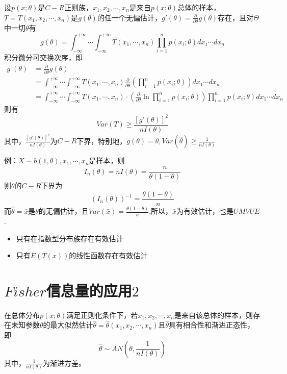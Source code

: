 \begin{theorem}[$C-R$不等式]
设$p(x;\theta)$是$C-R$正则族，$x_{1},x_{2},\cdots,x_{n}$是来自$p(x;\theta)$总体的样本，$T=T(x_{1},x_{2},\cdots,x_{n})$是$g(\theta)$的任一个无偏估计，$g'(\theta )=\frac{\partial }{\partial \theta } g(\theta )$存在，且对$\Theta$中一切$\theta$有
$$g(\theta )=\int_{-\infty }^{+\infty } \cdots \int_{-\infty }^{+\infty }T(x_{1},\cdots ,x_{n})\prod_{i=1}^{n}p(x_{i};\theta )dx_{1}\cdots dx_{n} $$
积分微分可交换次序，即
$$\begin{aligned}
g^{\prime}(\theta) &=\frac{\partial}{\partial \theta} g(\theta)\\
&=\int_{-\infty}^{+\infty} \cdots \int_{-\infty}^{+\infty} T\left(x_{1}, \cdots, x_{n}\right) \frac{\partial}{\partial \theta}\left(\prod_{i=1}^{n} p\left(x_{i} ; \theta\right)\right) d x_{1}\cdots d x_{n} \\
&=\int_{-\infty}^{+\infty} \cdots \int_{-\infty}^{+\infty} T\left(x_{1}, \cdots, x_{n}\right) \cdot\left(\frac{\partial}{\partial \theta} \ln \prod_{i=1}^{n} p\left(x_{i} ; \theta\right)\right) \prod_{i=1}^{n} p\left(x_{i}; \theta\right) d x_{1} \cdots d x_{n}
\end{aligned}$$
则有$$Var(T)\ge \frac{\left  [ g'(\theta ) \right ] ^{2}}{nI(\theta )} $$
其中，$\frac{\left  [ g'(\theta ) \right ] ^{2}}{nI(\theta )}$为$C-R$下界，特别地，$g(\theta)=\theta,Var(\hat{\theta})\ge \frac{1}{nI(\theta)}$
\end{theorem}
例：$X\sim b(1,\theta),x_{1}, \cdots, x_{n}$是样本，则$$I_{n}(\theta)=nI(\theta)=\frac{n}{\theta(1-\theta)}$$
则$\theta$的$C-R$下界为$$(I_{n}(\theta))^{-1}=\frac{\theta(1-\theta)}{n}$$
而$\hat{\theta}=\bar{x}$是$\theta$的无偏估计，且$Var(\bar{x})=\frac{\theta(1-\theta)}{n}$,所以，$\bar{x}$为有效估计，也是$UMVUE$.\\
\begin{remark}
\begin{itemize}
    \item 只有在指数型分布族存在有效估计
    \item 只有$E(T(x))$的线性函数存在有效估计
\end{itemize}
\end{remark}
\section{$Fisher$信息量的应用$2$}
\begin{theorem}
在总体分布$p(x;\theta)$满足正则化条件下，若$x_{1},x_{2},\cdots,x_{n}$是来自该总体的样本，则存在未知参数$\theta$的最大似然估计$\hat{\theta}=\hat{\theta}(x_{1},x_{2},\cdots,x_{n})$且$\hat{\theta}$具有相合性和渐进正态性，即$$\hat{\theta}\sim AN(\theta,\frac{1}{nI(\theta)})$$其中，$\frac{1}{nI(\theta)}$为渐进方差。
\end{theorem}
